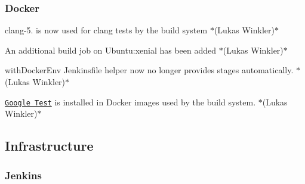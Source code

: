 \subsubsection*{Docker}


\begin{DoxyItemize}
\item {\ttfamily clang-\/5.} is now used for clang tests by the build system $\ast$(Lukas Winkler)$\ast$
\item An additional build job on Ubuntu\+:xenial has been added $\ast$(Lukas Winkler)$\ast$
\item {\ttfamily with\+Docker\+Env} Jenkinsfile helper now no longer provides stages automatically. $\ast$(Lukas Winkler)$\ast$
\item \href{https://github.com/google/googletest}{\tt Google Test} is installed in Docker images used by the build system. $\ast$(Lukas Winkler)$\ast$
\end{DoxyItemize}

\subsection*{Infrastructure}

\subsubsection*{Jenkins}



